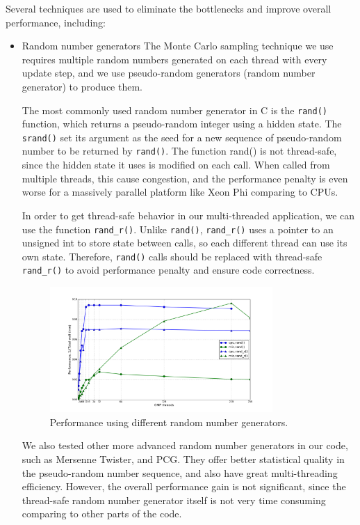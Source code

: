 Several techniques are used to eliminate the bottlenecks and improve overall
performance, including:
\begin{itemize}
\item Random number generators
    The Monte Carlo sampling technique we use requires multiple random numbers 
generated on each thread with every update step, and we use pseudo-random generators (random number generator)
to produce them. 

  The most commonly used random number generator in C is the \texttt{rand()} function, which 
returns a pseudo-random integer using a hidden state. The \texttt{srand()} set 
its argument as the seed for a new sequence of pseudo-random number to be returned
by \texttt{rand()}. The function rand() is not thread-safe, since the hidden 
state it uses is modified on each call. When called from multiple threads,
this cause congestion, and the performance penalty is even worse for a massively 
parallel platform like Xeon Phi comparing to CPUs.

In order to get thread-safe behavior in
our multi-threaded application, we can use the function \texttt{rand\_r()}. Unlike
\texttt{rand()}, \texttt{rand\_r()} uses a pointer to an unsigned int to store state
between calls, so each different thread can use its own state. 
Therefore, \texttt{rand()} calls should be replaced with thread-safe \texttt{rand\_r()}
to avoid performance penalty and ensure code correctness.

\begin{figure}
  \centering
  \includegraphics[width=0.8\textwidth] {img/mic/perf_rand_r.png}
  \caption{Performance using different random number generators.}
\end{figure}

  We also tested other more advanced random number generators in our code, such as Mersenne Twister, 
and PCG. They offer better statistical quality in the pseudo-random number sequence,
and also have great multi-threading efficiency. However, the overall performance
gain is not significant, since the thread-safe random number generator itself is not very time consuming
comparing to other parts of the code. 


\end{itemize}
